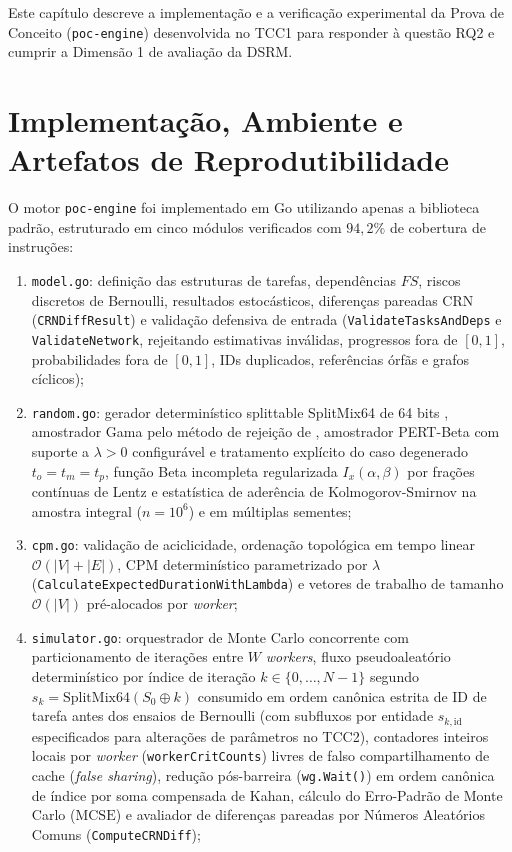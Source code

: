 \documentclass[12pt,openany,oneside,a4paper,english,brazilian,sumario=tradicional]{abntex2}
\begin{document}
Este capítulo descreve a implementação e a verificação experimental da Prova de Conceito (\texttt{poc-engine}) desenvolvida no TCC1 para responder à questão RQ2 e cumprir a Dimensão 1 de avaliação da DSRM.

\section{Implementação, Ambiente e Artefatos de Reprodutibilidade}\label{sec:poc_repro}

O motor \texttt{poc-engine} foi implementado em Go utilizando apenas a biblioteca padrão, estruturado em cinco módulos verificados com $94{,}2\%$ de cobertura de instruções:
\begin{enumerate}
  \item \texttt{model.go}: definição das estruturas de tarefas, dependências $FS$, riscos discretos de Bernoulli, resultados estocásticos, diferenças pareadas CRN (\texttt{CRNDiffResult}) e validação defensiva de entrada (\texttt{ValidateTasksAndDeps} e \texttt{ValidateNetwork}, rejeitando estimativas inválidas, progressos fora de $[0,1]$, probabilidades fora de $[0,1]$, IDs duplicados, referências órfãs e grafos cíclicos);
  \item \texttt{random.go}: gerador determinístico splittable SplitMix64 de 64 bits \cite{steele2014,lecuyer2017}, amostrador Gama pelo método de rejeição de , amostrador PERT-Beta com suporte a $\lambda > 0$ configurável e tratamento explícito do caso degenerado $t_o = t_m = t_p$, função Beta incompleta regularizada $I_x(\alpha,\beta)$ por frações contínuas de Lentz e estatística de aderência de Kolmogorov-Smirnov na amostra integral ($n=10^6$) e em múltiplas sementes;
  \item \texttt{cpm.go}: validação de aciclicidade, ordenação topológica em tempo linear $\mathcal{O}(|V|+|E|)$, CPM determinístico parametrizado por $\lambda$ (\texttt{CalculateExpected}\allowbreak\texttt{DurationWithLambda}) e vetores de trabalho de tamanho $\mathcal{O}(|V|)$ pré-alocados por \textit{worker};
  \item \texttt{simulator.go}: orquestrador de Monte Carlo concorrente com particionamento de iterações entre $W$ \textit{workers}, fluxo pseudoaleatório determinístico por índice de iteração $k \in \{0,\dots,N-1\}$ segundo $s_k = \mathrm{SplitMix64}(S_0 \oplus k)$ \cite{steele2014,lecuyer2017} consumido em ordem canônica estrita de ID de tarefa antes dos ensaios de Bernoulli (com subfluxos por entidade $s_{k,\mathrm{id}}$ especificados para alterações de parâmetros no TCC2), contadores inteiros locais por \textit{worker} (\texttt{workerCritCounts}) livres de falso compartilhamento de cache (\textit{false sharing}), redução pós-barreira (\texttt{wg.Wait()}) em ordem canônica de índice por soma compensada de Kahan, cálculo do Erro-Padrão de Monte Carlo ($\mathrm{MCSE}$) \cite{law2015} e avaliador de diferenças pareadas por Números Aleatórios Comuns (\texttt{ComputeCRNDiff});

\end{enumerate}
\end{document}
